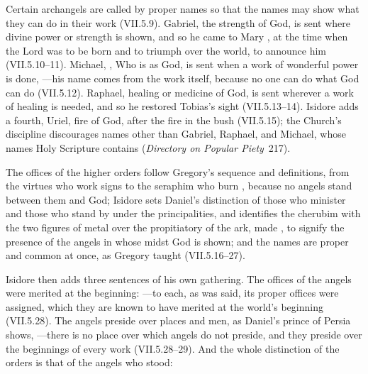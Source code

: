 Certain archangels are called by proper names so that the names may show
what they can do in their work (VII.5.9). Gabriel, the strength of God, is
sent where divine power or strength is shown, and so he came to Mary
,
at the time when the Lord was to be born and to triumph over the world, to
announce him  (VII.5.10--11). Michael, , Who is as God, is sent when a
work of wonderful power is done, ---his name comes from the work
itself, because no one can do what God can do (VII.5.12). Raphael, healing
or medicine of God, is sent wherever a work of healing is needed, and so he
restored Tobias's sight (VII.5.13--14). Isidore adds a fourth, Uriel, fire
of God, after the fire in the bush (VII.5.15); the Church's
discipline discourages names other than Gabriel, Raphael, and Michael, whose
names Holy Scripture contains (\emph{Directory on Popular Piety}~217).

The offices of the higher orders follow Gregory's sequence and definitions,
from the virtues who work signs to the seraphim who burn , because no angels stand between them and
God; Isidore sets Daniel's distinction of those who minister and those who
stand by under the principalities, and identifies the cherubim with the two
figures of metal over the propitiatory of the ark, made , to
signify the presence of the angels in whose midst God is shown; and the names
are proper and common at once, as Gregory taught (VII.5.16--27).

Isidore then adds three sentences of his own gathering. The offices of the
angels were merited at the beginning: ---to each, as was said, its proper offices were assigned,
which they are known to have merited at the world's beginning (VII.5.28).
The angels preside over places and men, as Daniel's prince of Persia shows,
---there is no place over which angels do not
preside, and they preside over the beginnings of every work (VII.5.28--29).
And the whole distinction of the orders is that of the angels who stood:

